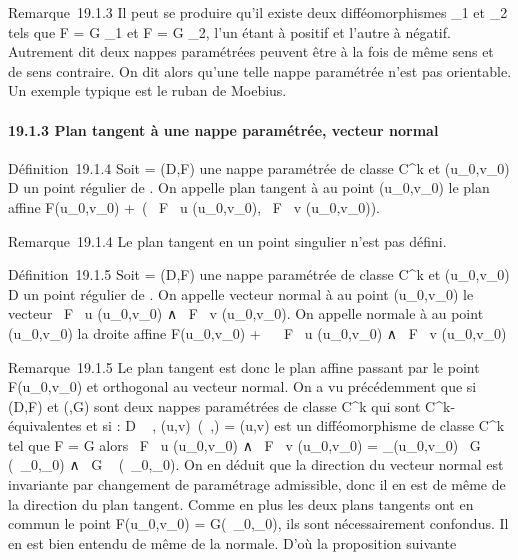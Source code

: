 \documentclass[]{article}
\begin{document}
Remarque~19.1.3 Il peut se produire qu'il existe deux difféomorphismes
\theta\_1 et \theta\_2 tels que F = G \cdot \theta\_1 et F = G \cdot
\theta\_2, l'un étant à \jmathacobien positif et l'autre à \jmathacobien
négatif. Autrement dit deux nappes paramétrées peuvent être à la fois de
même sens et de sens contraire. On dit alors qu'une telle nappe
paramétrée n'est pas orientable. Un exemple typique est le ruban de
Moebius.

\paragraph{19.1.3 Plan tangent à une nappe paramétrée, vecteur normal}

Définition~19.1.4 Soit \Gamma = (D,F) une nappe paramétrée de classe
C^k et (u\_0,v\_0) \in D un point régulier de
\Sigma. On appelle plan tangent à \Sigma au point (u\_0,v\_0) le
plan affine F(u\_0,v\_0) +\
\mathrmVect( \partial~F \over \partial~u
(u\_0,v\_0), \partial~F \over \partial~v
(u\_0,v\_0)).

Remarque~19.1.4 Le plan tangent en un point singulier n'est pas défini.

Définition~19.1.5 Soit \Sigma = (D,F) une nappe paramétrée de classe
C^k et (u\_0,v\_0) \in D un point régulier de
\Sigma. On appelle vecteur normal à \Sigma au point (u\_0,v\_0) le
vecteur  \partial~F \over \partial~u (u\_0,v\_0) ∧
\partial~F \over \partial~v (u\_0,v\_0). On appelle
normale à \Sigma au point (u\_0,v\_0) la droite affine
F(u\_0,v\_0) + ~ \partial~F \over \partial~u
(u\_0,v\_0) ∧ \partial~F \over \partial~v
(u\_0,v\_0)

Remarque~19.1.5 Le plan tangent est donc le plan affine passant par le
point F(u\_0,v\_0) et orthogonal au vecteur normal. On a
vu précédemment que si (D,F) et (\Delta,G) sont deux nappes paramétrées de
classe C^k qui sont C^k-équivalentes et si \theta : D \rightarrow~
\Delta, (u,v)\mapsto~(\lambda~,\mu) = \theta(u,v) est un
difféomorphisme de classe C^k tel que F = G \cdot \theta alors  \partial~F
\over \partial~u (u\_0,v\_0) ∧ \partial~F
\over \partial~v (u\_0,v\_0) =
\jmath\_\theta(u\_0,v\_0) \partial~G \over \partial~\lambda~
(\lambda~\_0,\mu\_0) ∧ \partial~G \over \partial~\mu
(\lambda~\_0,\mu\_0). On en déduit que la direction du vecteur
normal est invariante par changement de paramétrage admissible, donc il
en est de même de la direction du plan tangent. Comme en plus les deux
plans tangents ont en commun le point F(u\_0,v\_0) =
G(\lambda~\_0,\mu\_0), ils sont nécessairement confondus. Il en
est bien entendu de même de la normale. D'où la proposition suivante
\end{document}
